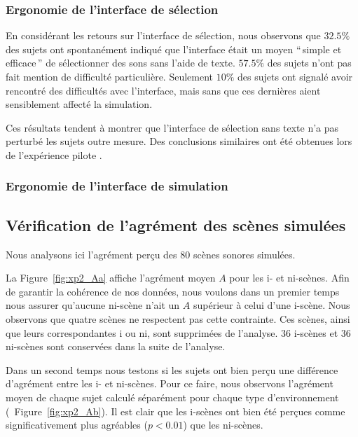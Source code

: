 \subsubsection{Ergonomie de l'interface de sélection}

En considérant les retours sur l'interface de sélection, nous observons que $32.5\%$ des sujets ont spontanément indiqué que l'interface était un moyen ``\,simple et efficace\,'' de sélectionner des sons sans l'aide de texte. $57.5\%$ des sujets n'ont pas fait mention de difficulté particulière. Seulement $10\%$ des sujets ont signalé avoir rencontré des difficultés avec l'interface, mais sans que ces dernières aient sensiblement affecté la simulation.

Ces résultats tendent à montrer que l'interface de sélection sans texte n'a pas perturbé les sujets outre mesure. Des conclusions similaires ont été obtenues lors de l'expérience pilote \citep{lafay2013atiam,lafay2014new}. \\


\subsubsection{Ergonomie de l'interface de simulation}


\subsection{Vérification de l'agrément des scènes simulées}

Nous analysons ici l'agrément perçu des $80$ scènes sonores simulées. 

La Figure~\ref{fig:xp2_Aa} affiche l'agrément moyen $A$ pour les i- et ni-scènes. Afin de garantir la cohérence de nos données, nous voulons dans un premier temps nous assurer qu'aucune ni-scène n'ait un $A$ supérieur à celui d'une i-scène. Nous observons que quatre scènes ne respectent pas cette contrainte. Ces scènes, ainsi que leurs correspondantes i ou ni, sont supprimées de l'analyse. 36 i-scènes et 36 ni-scènes sont conservées dans la suite de l'analyse.

Dans un second temps nous testons si les sujets ont bien perçu une différence d'agrément entre les i- et ni-scènes. Pour ce faire, nous observons l'agrément moyen de chaque sujet calculé séparément pour chaque type d'environnement (\Cf~Figure~\ref{fig:xp2_Ab}). Il est clair que les i-scènes ont bien été perçues comme significativement plus agréables ($p<0.01$) que les ni-scènes.

